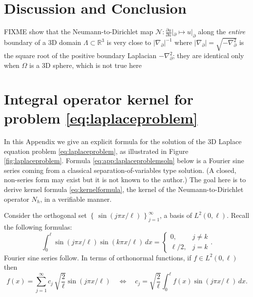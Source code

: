 \documentclass[letterpaper,final,12pt,reqno]{amsart}
\theoremstyle{cstyle}
\theoremstyle{cstyle*}
\theoremstyle{dstyle}
\numberwithin{equation}{section}
\newcommand{\RR}{\mathbb{R}}
\newcommand{\grad}{\nabla}
\begin{document}
\section{Discussion and Conclusion} \label{sec:conclusion}

FIXME \cite{Girouardetal2022} show that the Neumann-to-Dirichlet map $\mathcal{N}:\frac{\partial u}{\partial n}|_{\partial} \mapsto u|_{\partial}$ along the \emph{entire} boundary of a 3D domain $\Lambda \subset \RR^3$ is very close to $|\grad_{\partial}|^{-1}$ where $|\grad_{\partial}| = \sqrt{-\grad_{\partial}^2}$ is the square root of the positive boundary Laplacian $-\grad_{\partial}^2$; they are identical only when $\Omega$ is a 3D sphere, which is not true here





\appendix
\section{Integral operator kernel for problem \eqref{eq:laplaceproblem}}

In this Appendix we give an explicit formula for the solution of the 3D Laplace equation problem \eqref{eq:laplaceproblem}, as illustrated in Figure \ref{fig:laplaceproblem}.  Formula \eqref{eq:app:laplaceproblemsoln} below is a Fourier sine series coming from a classical separation-of-variables type solution.  (A closed, non-series form may exist but it is not known to the author.)  The goal here is to derive kernel formula \eqref{eq:kernelformula}, the kernel of the Neumann-to-Dirichlet operator $N_h$, in a verifiable manner.

Consider the orthogonal set $\left\{\,\sin(j\pi x/\ell)\,\right\}_{j=1}^\infty$, a basis of $L^2(0,\ell)$.  Recall the following formulas:
    $$\int_0^\ell \sin(j\pi x/\ell) \sin(k\pi x/\ell)\,dx = \begin{cases} 0, & j \ne k \\ \ell/2, & j=k \end{cases}.$$
Fourier sine series follow.  In terms of orthonormal functions, if $f \in L^2(0,\ell)$ then
    $$f(x) = \sum_{j=1}^\infty c_j\, \sqrt{\frac{2}{\ell}} \sin(j\pi x/\ell) \quad \iff \quad c_j = \sqrt{\frac{2}{\ell}} \int_0^\ell f(x) \sin(j\pi x/\ell)\,dx.$$
\end{document}
